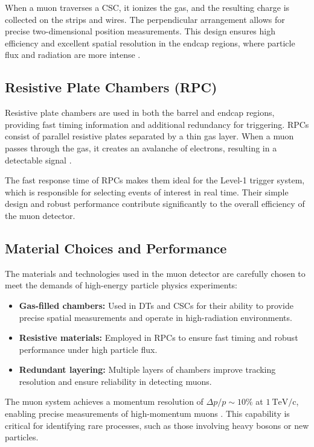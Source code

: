 When a muon traverses a CSC, it ionizes the gas, and the resulting charge is collected on the strips and wires. The perpendicular arrangement allows for precise two-dimensional position measurements. This design ensures high efficiency and excellent spatial resolution in the endcap regions, where particle flux and radiation are more intense \cite{muon_tdr}.

\subsection{Resistive Plate Chambers (RPC)}
Resistive plate chambers are used in both the barrel and endcap regions, providing fast timing information and additional redundancy for triggering. RPCs consist of parallel resistive plates separated by a thin gas layer. When a muon passes through the gas, it creates an avalanche of electrons, resulting in a detectable signal \cite{muon_tdr}.

The fast response time of RPCs makes them ideal for the Level-1 trigger system, which is responsible for selecting events of interest in real time. Their simple design and robust performance contribute significantly to the overall efficiency of the muon detector.

\subsection{Material Choices and Performance}
The materials and technologies used in the muon detector are carefully chosen to meet the demands of high-energy particle physics experiments:
\begin{itemize}
    \item \textbf{Gas-filled chambers:} Used in DTs and CSCs for their ability to provide precise spatial measurements and operate in high-radiation environments.
    \item \textbf{Resistive materials:} Employed in RPCs to ensure fast timing and robust performance under high particle flux.
    \item \textbf{Redundant layering:} Multiple layers of chambers improve tracking resolution and ensure reliability in detecting muons.
\end{itemize}

The muon system achieves a momentum resolution of $\Delta p / p \sim 10\%$ at $1~\mathrm{TeV/c}$, enabling precise measurements of high-momentum muons \cite{muon_tdr}. This capability is critical for identifying rare processes, such as those involving heavy bosons or new particles.

